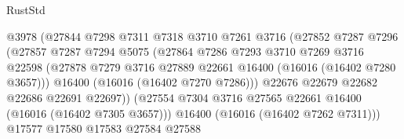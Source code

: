 \begin{lexlean}{RustStd}
\begin{coremodule}
                                      @3978
                                      (@27844
                                        @7298
                                        @7311
                                        @7318
                                        @3710
                                        @7261
                                        @3716
                                        (@27852
                                          @7287
                                          @7296
                                          (@27857
                                            @7287
                                            @7294
                                            @5075
                                            (@27864
                                              @7286
                                              @7293
                                              @3710
                                              @7269
                                              @3716
                                              @22598
                                              (@27878
                                                @7279
                                                @3716
                                                @27889
                                                @22661
                                                @16400
                                                (@16016 (@16402 @7280 @3657)))
                                              @16400
                                              (@16016 (@16402 @7270 @7286)))
                                            @22676
                                            @22679
                                            @22682
                                            @22686
                                            @22691
                                            @22697))
                                        (@27554
                                          @7304
                                          @3716
                                          @27565
                                          @22661
                                          @16400
                                          (@16016 (@16402 @7305 @3657)))
                                        @16400
                                        (@16016 (@16402 @7262 @7311)))
                                      @17577
                                      @17580
                                      @17583
                                      @27584
                                      @27588

\end{coremodule}
\end{lexlean}
